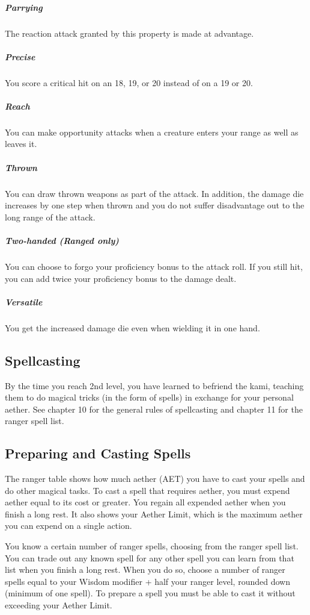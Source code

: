 \subparagraph*{Parrying} The reaction attack granted by this property is made at advantage.

\subparagraph*{Precise} You score a critical hit on an 18, 19, or 20 instead of on a 19 or 20.

\subparagraph*{Reach} You can make opportunity attacks when a creature enters your range as well as leaves it.

\subparagraph*{Thrown} You can draw thrown weapons as part of the attack. In addition, the damage die increases by one step when thrown and you do not suffer disadvantage out to the long range of the attack.

\subparagraph*{Two-handed (Ranged only)} You can choose to forgo your proficiency bonus to the attack roll. If you still hit, you can add twice your proficiency bonus to the damage dealt.

\subparagraph*{Versatile} You get the increased damage die even when wielding it in one hand.

\subsection{Spellcasting}

By the time you reach 2nd level, you have learned to befriend the kami, teaching them to do magical tricks (in the form of spells) in exchange for your personal aether. See chapter 10 for the general rules of spellcasting and chapter 11 for the ranger spell list.

\subsection{Preparing and Casting Spells}

The ranger table shows how much aether (AET) you have to cast your spells and do other magical tasks. To cast a spell that requires aether, you must expend aether equal to its cost or greater. You regain all expended aether when you finish a long rest. It also shows your Aether Limit, which is the maximum aether you can expend on a single action.

You know a certain number of ranger spells, choosing from the ranger spell list. You can trade out any known spell for any other spell you can learn from that list when you finish a long rest. When you do so, choose a number of ranger spells equal to your Wisdom modifier + half your ranger level, rounded down (minimum of one spell). To prepare a spell you must be able to cast it without exceeding your Aether Limit.

